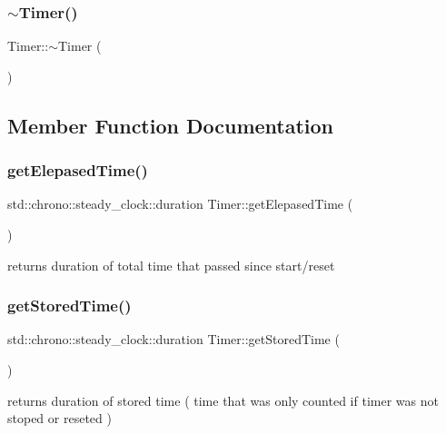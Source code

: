 \subsubsection{\texorpdfstring{$\sim$Timer()}{~Timer()}}
{\footnotesize\ttfamily Timer\+::$\sim$\+Timer (\begin{DoxyParamCaption}{ }\end{DoxyParamCaption})}



\subsection{Member Function Documentation}
\mbox{\label{classsc_1_1_timer_aad547701ae3ed5f294a9db485b9277e0}} 
\subsubsection{\texorpdfstring{getElepasedTime()}{getElepasedTime()}}
{\footnotesize\ttfamily std\+::chrono\+::steady\+\_\+clock\+::duration Timer\+::get\+Elepased\+Time (\begin{DoxyParamCaption}{ }\end{DoxyParamCaption})}



returns duration of total time that passed since start/reset 

\mbox{\label{classsc_1_1_timer_a4e79e854f3a54d89822cc9c459742988}} 
\subsubsection{\texorpdfstring{getStoredTime()}{getStoredTime()}}
{\footnotesize\ttfamily std\+::chrono\+::steady\+\_\+clock\+::duration Timer\+::get\+Stored\+Time (\begin{DoxyParamCaption}{ }\end{DoxyParamCaption})}



returns duration of stored time ( time that was only counted if timer was not stoped or reseted ) 

\mbox{\label{classsc_1_1_timer_a9020542d73357a4eef512eefaf57524b}} 
